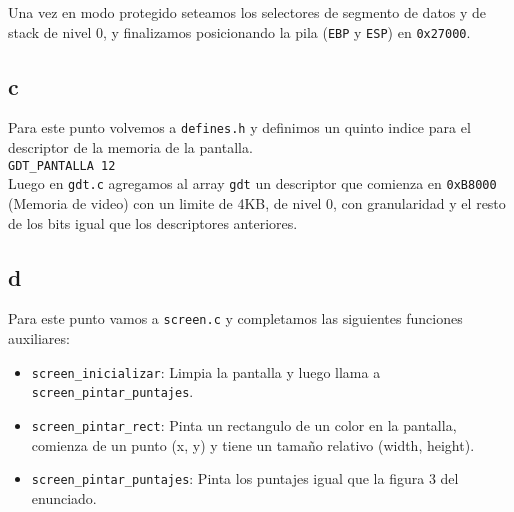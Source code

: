 Una vez en modo protegido seteamos los selectores de segmento de datos y de stack de nivel 0, y finalizamos posicionando la pila (\texttt{EBP} y \texttt{ESP}) en \texttt{0x27000}.

\subsection{c}
Para este punto volvemos a \texttt{defines.h} y definimos un quinto indice para el descriptor de la memoria de la pantalla. \\
\texttt{GDT\_PANTALLA         12} \\

Luego en \texttt{gdt.c} agregamos al array \texttt{gdt} un descriptor que comienza en \texttt{0xB8000} (Memoria de video) con un limite de 4KB, de nivel 0, con granularidad y el resto de los bits igual que los descriptores anteriores.

\subsection{d}
Para este punto vamos a \texttt{screen.c} y completamos las siguientes funciones auxiliares:

\begin{itemize}
\item \texttt{screen\_inicializar}: Limpia la pantalla y luego llama a \texttt{screen\_pintar\_puntajes}.
\item \texttt{screen\_pintar\_rect}: Pinta un rectangulo de un color en la pantalla, comienza de un punto (x, y) y tiene un tamaño relativo (width, height).
\item \texttt{screen\_pintar\_puntajes}: Pinta los puntajes igual que la figura 3 del enunciado.
\end{itemize}